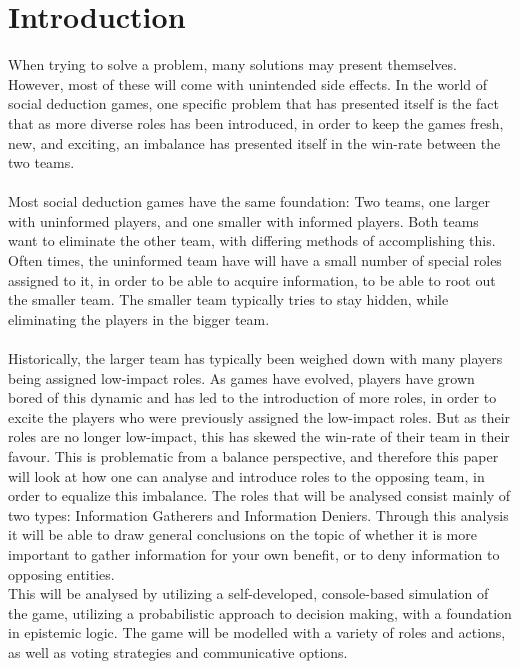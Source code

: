 \section{Introduction}
When trying to solve a problem, many solutions may present themselves. However,
most of these will come with unintended side effects. In the world of social
deduction games, one specific problem that has presented itself is the fact
that as more diverse roles has been introduced, in order to keep the games
fresh, new, and exciting, an imbalance has presented itself in the win-rate
between the two teams. \\ \\ Most social deduction games have the same
foundation: Two teams, one larger with uninformed players, and one smaller with
informed players. Both teams want to eliminate the other team, with differing
methods of accomplishing this. Often times, the uninformed team have will have
a small number of special roles assigned to it, in order to be able to acquire
information, to be able to root out the smaller team. The smaller team
typically tries to stay hidden, while eliminating the players in the bigger
team.\\ \\ Historically, the larger team has typically been weighed down with
many players being assigned low-impact roles. As games have evolved, players
have grown bored of this dynamic and has led to the introduction of more roles,
in order to excite the players who were previously assigned the low-impact
roles. But as their roles are no longer low-impact, this has skewed the
win-rate of their team in their favour. This is problematic from a balance
perspective, and therefore this paper will look at how one can analyse and
introduce roles to the opposing team, in order to equalize this imbalance. The
roles that will be analysed consist mainly of two types: Information Gatherers
and Information Deniers. Through this analysis it will be able to draw general
conclusions on the topic of whether it is more important to gather information
for your own benefit, or to deny information to opposing entities. \\

This will be analysed by utilizing a self-developed, console-based simulation
of the game, utilizing a probabilistic approach to decision making, with a
foundation in epistemic logic. The game will be modelled with a variety of
roles and actions, as well as voting strategies and communicative options.

